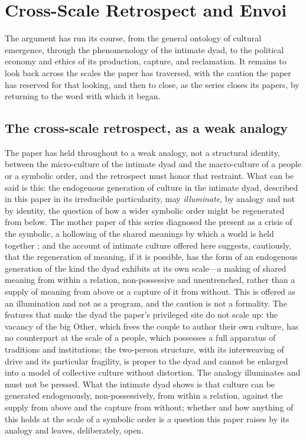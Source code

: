 \section{Cross-Scale Retrospect and Envoi}
\label{p24:sec:envoi}

\noindent
The argument has run its course, from the general ontology of cultural emergence, through the phenomenology of the intimate dyad, to the political economy and ethics of its production, capture, and reclamation. It remains to look back across the scales the paper has traversed, with the caution the paper has reserved for that looking, and then to close, as the series closes its papers, by returning to the word with which it began.

\subsection*{The cross-scale retrospect, as a weak analogy}

The paper has held throughout to a weak analogy, not a structural identity, between the micro-culture of the intimate dyad and the macro-culture of a people or a symbolic order, and the retrospect must honor that restraint. What can be said is this: the endogenous generation of culture in the intimate dyad, described in this paper in its irreducible particularity, may \emph{illuminate}, by analogy and not by identity, the question of how a wider symbolic order might be regenerated from below. The mother paper of this series diagnosed the present as a crisis of the symbolic, a hollowing of the shared meanings by which a world is held together \parencite{wan2024grb}; and the account of intimate culture offered here suggests, cautiously, that the regeneration of meaning, if it is possible, has the form of an endogenous generation of the kind the dyad exhibits at its own scale---a making of shared meaning from within a relation, non-possessive and unentrenched, rather than a supply of meaning from above or a capture of it from without. This is offered as an illumination and not as a program, and the caution is not a formality. The features that make the dyad the paper's privileged site do not scale up: the vacancy of the big Other, which frees the couple to author their own culture, has no counterpart at the scale of a people, which possesses a full apparatus of traditions and institutions; the two-person structure, with its interweaving of drive and its particular fragility, is proper to the dyad and cannot be enlarged into a model of collective culture without distortion. The analogy illuminates and must not be pressed. What the intimate dyad shows is that culture can be generated endogenously, non-possessively, from within a relation, against the supply from above and the capture from without; whether and how anything of this holds at the scale of a symbolic order is a question this paper raises by its analogy and leaves, deliberately, open.

